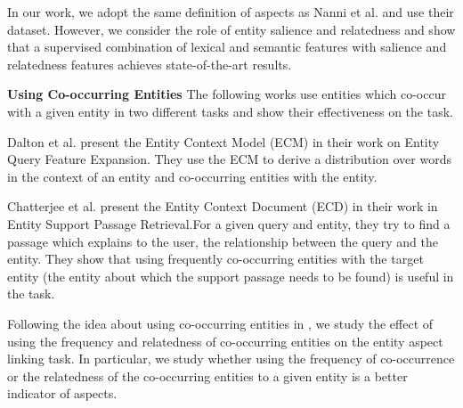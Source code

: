 
In our work, we adopt the same definition of aspects as Nanni  et al. \cite{nanni2018entity} and use their dataset. However, we consider the role of entity salience and relatedness and show that a supervised combination of lexical and semantic features with salience and relatedness features achieves state-of-the-art results.

\textbf{Using Co-occurring Entities}
The following works use entities which co-occur with a given entity in two different tasks and show their effectiveness on the task. 

Dalton et al. \cite{dalton2014entity} present the Entity Context Model (ECM) in their work on Entity Query Feature Expansion. They use the ECM to derive a distribution over words in the context of an entity and co-occurring entities with the entity.

Chatterjee et al. \cite{chatterjee2019why} present the Entity Context Document (ECD) in their work in Entity Support Passage Retrieval.For a given query and entity, they try to find a passage which explains to the user, the relationship between the query and the entity. They show that using frequently co-occurring entities with the target entity (the entity about which the support passage needs to be found) is useful in the task.

Following the idea about using co-occurring entities in \cite{dalton2014entity, chatterjee2019why}, we study the effect of using the frequency and relatedness of co-occurring entities on the entity aspect linking task. In particular, we study whether using the frequency of co-occurrence or the relatedness of the co-occurring entities to a given entity is a better indicator of aspects. 


